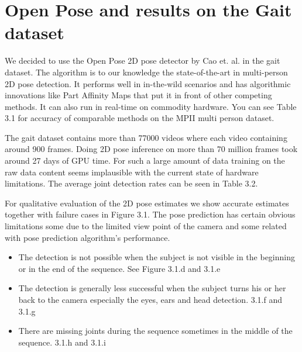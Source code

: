 \section{Open Pose and results on the Gait dataset}

We decided to use the Open Pose 2D pose detector by Cao et. al. \parencite{cao2016realtime} in the gait dataset. The algorithm is to our knowledge the state-of-the-art in multi-person 2D pose detection. It performs well in in-the-wild scenarios and has algorithmic innovations like Part Affinity Maps that put it in front of other competing methods. It can also run in real-time on commodity hardware. You can see Table 3.1 for accuracy of comparable methods on the MPII multi person dataset.

The gait dataset contains more than 77000 videos where each video containing around 900 frames. Doing 2D pose inference on more than 70 million frames took around 27 days of GPU time. For such a large amount of data training on the raw data content seems implausible with the current state of hardware limitations. The average joint detection rates can be seen in Table 3.2.

For qualitative evaluation of the 2D pose estimates we show accurate estimates together with failure cases in Figure 3.1. The pose prediction has certain obvious limitations some due to the limited view point of the camera and some related with pose prediction algorithm's performance. 

\begin{itemize}
    \item The detection is not possible when the subject is not visible in the beginning or in the end of the sequence. See Figure 3.1.d and 3.1.e
    \item The detection is generally less successful  when the subject turns his or her back to the camera especially the eyes, ears and head detection. 3.1.f and 3.1.g
    \item There are missing joints during the sequence sometimes in the middle of the sequence. 3.1.h and 3.1.i
\end{itemize}
